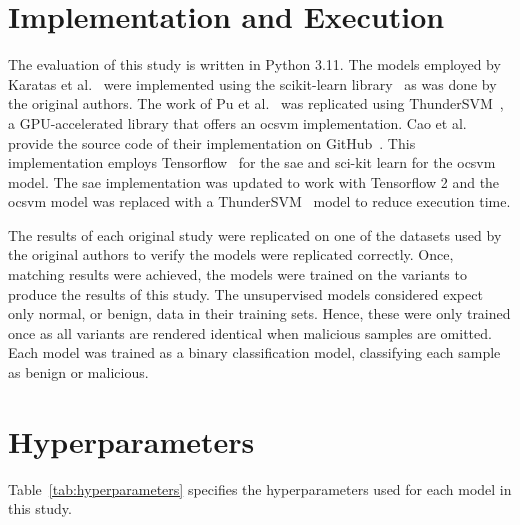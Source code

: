 \section{Implementation and Execution}%
\label{sec:implementation}

The evaluation of this study is written in Python 3.11. The models employed by
Karatas et al.~\cite{Karatas} were implemented using the scikit-learn
library~\cite{scikit-learn} as was done by the original authors. The work of Pu
et al.~\cite{Pu} was replicated using ThunderSVM~\cite{ThunderSVM}, a
GPU-accelerated library that offers an \gls{ocsvm} implementation. Cao et
al.~\cite{Cao} provide the source code of their implementation on
GitHub~\cite{cao_git}. This implementation employs Tensorflow~\cite{tensorflow}
for the \gls{sae} and sci-kit learn for the \gls{ocsvm} model. The \gls{sae}
implementation was updated to work with Tensorflow 2 and the \gls{ocsvm} model
was replaced with a ThunderSVM~\cite{ThunderSVM} model to reduce execution
time.

The results of each original study were replicated on one of the datasets used
by the original authors to verify the models were replicated correctly. Once,
matching results were achieved, the models were trained on the variants to
produce the results of this study. The unsupervised models considered expect
only normal, or benign, data in their training sets. Hence, these were only
trained once as all variants are rendered identical when malicious samples are
omitted. Each model was trained as a binary classification model, classifying
each sample as benign or malicious.


\section{Hyperparameters}%
\label{sec:hyperparameters}

Table~\ref{tab:hyperparameters} specifies the hyperparameters used for each
model in this study.

